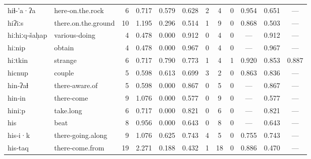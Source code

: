 \begin{landscape}
\begin{longtable}[c]{ l l | r r c c | c c c | c c c }
  hiɬ‑'a·ʔa          & here‑on.the.rock          & 6   & 0.717                     & 0.579           & 0.628      & 2         & 4           & 0            & 0.954     & 0.651       & —\\
  hiʔiːs             & there.on.the.ground       & 10  & 1.195                     & 0.296           & 0.514      & 1         & 9           & 0            & 0.868     & 0.503       & —\\
  hiːhiːq‑šaḥap      & various‑doing             & 4   & 0.478                     & 0.000           & 0.912      & 0         & 4           & 0            & —         & 0.912       & —\\
  hiːnip             & obtain                    & 4   & 0.478                     & 0.000           & 0.967      & 0         & 4           & 0            & —         & 0.967       & —\\
  hiːtkin            & strange                   & 6   & 0.717                     & 0.790           & 0.773      & 1         & 4           & 1            & 0.920     & 0.853       & 0.887\\
  hicnup             & couple                    & 5   & 0.598                     & 0.613           & 0.699      & 3         & 2           & 0            & 0.863     & 0.836       & —\\
  hin‑ʔaɬ            & there‑aware.of            & 5   & 0.598                     & 0.000           & 0.867      & 0         & 5           & 0            & —         & 0.867       & —\\
  hin‑in             & there‑come                & 9   & 1.076                     & 0.000           & 0.577      & 0         & 9           & 0            & —         & 0.577       & —\\
  hiniːp             & take.long                 & 6   & 0.717                     & 0.000           & 0.821      & 0         & 6           & 0            & —         & 0.821       & —\\
  his                & beat                      & 8   & 0.956                     & 0.000           & 0.643      & 0         & 8           & 0            & —         & 0.643       & —\\
  his‑i·k            & there‑going.along         & 9   & 1.076                     & 0.625           & 0.743      & 4         & 5           & 0            & 0.755     & 0.743       & —\\
  his‑taq            & there‑come.from           & 19  & 2.271                     & 0.188           & 0.432      & 1         & 18          & 0            & 0.886     & 0.470       & —\\

\end{longtable}
\end{landscape}
